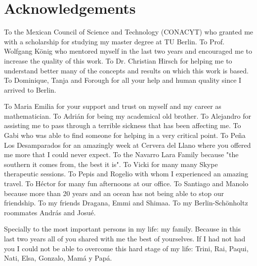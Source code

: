 \documentclass[11pt, english, singlespacing, headsepline, ]{MastersDoctoralThesis}
\theoremstyle{definition}
\begin{document}




\chapter*{Acknowledgements}\pagestyle{empty}

To the Mexican Council of Science and Technology (CONACYT) who granted me with a scholarship for studying my master degree at TU Berlin. To Prof. Wolfgang König who mentored myself in the last two years and encouraged me to increase the quality of this work. To Dr. Christian Hirsch for helping me to understand better many of the concepts and results on which this work is based. To Dominique, Tanja and Forough for all your help and human quality since I arrived to Berlin.

To Maria Emilia for your support and trust on myself and my career as mathematician. To Adrián for being my academical old brother. To Alejandro for assisting me to pass through a terrible sickness that has been affecting me. To Gabi who was able to find someone for helping in a very critical point. To Peña Los Desamparados for an amazingly week at Cervera del Llano where you offered me more that I could never expect. To the Navarro Lara Family because "the southern it comes from, the best it is". To Vicki for many many Skype therapeutic sessions. To Pepis and Rogelio with whom I experienced an amazing travel. To Héctor for many fun afternoons at our office. To Santiago and Manolo because more than 20 years and an ocean has not being able to stop our friendship. To my friends Dragana, Emmi and Shimaa. To my Berlin-Schönholtz roommates András and Josué.

Specially to the most important persons in my life: my family. Because in this last two years all of you shared with me the best of yourselves. If I had not had you I could not be able to overcome this hard stage of my life: Trini, Rai, Paqui, Nati, Elsa, Gonzalo, Mamá y Papá.
\end{document}
